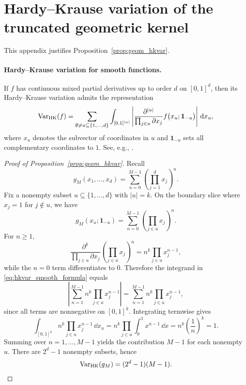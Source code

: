 
\section{Hardy--Krause variation of the truncated geometric kernel}
\label{app:hkvar_truncated_geometric}

This appendix justifies Proposition~\ref{prop:geom_hkvar}.

\paragraph{Hardy--Krause variation for smooth functions.}
If $f$ has continuous mixed partial derivatives up to order $d$ on $[0,1]^d$, then its Hardy--Krause variation admits the representation
\begin{equation}
\label{eq:hkvar_smooth_formula}
\mathrm{Var}_{\mathrm{HK}}(f)
=
\sum_{\emptyset\neq u\subseteq\{1,\dots,d\}}
\int_{[0,1]^{|u|}}
\left|
\frac{\partial^{|u|}}{\prod_{j\in u}\partial x_j}
f\big(x_u; \mathbf{1}_{-u}\big)
\right|\,
\mathrm{d} x_u,
\end{equation}
where $x_u$ denotes the subvector of coordinates in $u$ and $\mathbf{1}_{-u}$ sets all complementary coordinates to $1$.
See, e.g., \cite[\S 3.3]{DickPillichshammer2010}.

\begin{proof}[Proof of Proposition~\ref{prop:geom_hkvar}]
Recall
\[
g_M(x_1,\dots,x_d)=\sum_{n=0}^{M-1}\left(\prod_{j=1}^d x_j\right)^n.
\]
Fix a nonempty subset $u\subseteq\{1,\dots,d\}$ with $|u|=k$.
On the boundary slice where $x_j=1$ for $j\notin u$, we have
\[
g_M(x_u;\mathbf{1}_{-u})=\sum_{n=0}^{M-1}\left(\prod_{j\in u} x_j\right)^n.
\]
For $n\ge 1$,
\[
\frac{\partial^k}{\prod_{j\in u}\partial x_j}
\left(\prod_{j\in u} x_j\right)^n
=
n^k\prod_{j\in u} x_j^{n-1},
\]
while the $n=0$ term differentiates to $0$.
Therefore the integrand in \eqref{eq:hkvar_smooth_formula} equals
\[
\left|
\sum_{n=1}^{M-1} n^k \prod_{j\in u} x_j^{n-1}
\right|
=
\sum_{n=1}^{M-1} n^k \prod_{j\in u} x_j^{n-1},
\]
since all terms are nonnegative on $[0,1]^k$.
Integrating termwise gives
\[
\int_{[0,1]^k}
n^k\prod_{j\in u} x_j^{n-1}\,\dd x_u
=
n^k\prod_{j\in u}\int_0^1 x^{n-1}\,\dd x
=
n^k\left(\frac{1}{n}\right)^k
=1.
\]
Summing over $n=1,\dots,M-1$ yields the contribution $M-1$ for each nonempty $u$.
There are $2^d-1$ nonempty subsets, hence
\[
\mathrm{Var}_{\mathrm{HK}}(g_M)=(2^d-1)(M-1).
\]
\end{proof}


